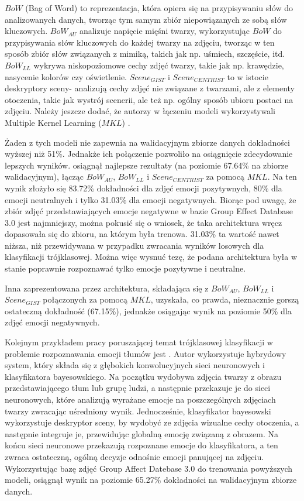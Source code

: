 $BoW$ (Bag of Word) \cite{BoW} to reprezentacja, która opiera się na przypisywaniu słów do analizowanych danych, tworząc tym samym zbiór niepowiązanych ze sobą słów kluczowych.
$BoW_{AU}$ analizuje napięcie mięśni twarzy, wykorzystując $BoW$ do przypisywania słów kluczowych do każdej twarzy na zdjęciu, tworząc w ten sposób zbiór słów związanych z mimiką, takich jak np. uśmiech, szczęście, itd.
$BoW_{LL}$ wykrywa niskopoziomowe cechy zdjęć twarzy, takie jak np. krawędzie, nasycenie kolorów czy oświetlenie. 
$Scene_{GIST}$ i $Scene_{CENTRIST}$ to w istocie deskryptory sceny- analizują cechy zdjęć nie związane z twarzami, ale z elementy otoczenia, takie jak wystrój scenerii, ale też np. ogólny sposób ubioru postaci na zdjęciu.
Należy jeszcze dodać, że autorzy w łączeniu modeli wykorzystywali Multiple Kernel Learning ($MKL$) \cite{MKL}. 

Żaden z tych modeli nie zapewnia na walidacyjnym zbiorze danych dokładności wyższej niż 51\%. Jednakże ich połączenie pozwoliło na osiągnięcie zdecydowanie lepszych wyników. \cite{GAD} osiągnął najlepsze rezultaty (na poziomie 67.64\% na zbiorze walidacyjnym), łącząc $BoW_{AU}$, $BoW_{LL}$ i $Scene_{CENTRIST}$ za pomocą $MKL$. Na ten wynik złożyło się 83.72\% dokładności dla zdjęć emocji pozytywnych, 80\% dla emocji neutralnych i tylko 31.03\% dla emocji negatywnych. Biorąc pod uwagę, że zbiór zdjęć przedstawiających emocje negatywne w bazie Group Effect Database 3.0 jest najmniejszy, można pokusić się o wniosek, że taka architektura wręcz dopasowała się do zbioru, na którym była trenowa. 31.03\% ta wartość nawet niższa, niż przewidywana w przypadku zwracania wyników losowych dla klasyfikacji trójklasowej. Można więc wysnuć tezę, że podana architektura była w stanie poprawnie rozpoznawać tylko emocje pozytywne i neutralne.

Inna zaprezentowana przez \cite{GAD} architektura, składająca się z $BoW_{AU}$, $BoW_{LL}$ i $Scene_{GIST}$ połączonych za pomocą $MKL$, uzyskała, co prawda, nieznacznie gorszą ostateczną dokładność (67.15\%), jednakże osiągając wynik na poziomie 50\% dla zdjęć emocji negatywnych.

Kolejnym przykładem pracy poruszającej temat trójklasowej klasyfikacji w problemie rozpoznawania emocji tłumów jest \cite{SGarg}. Autor wykorzystuje hybrydowy system, który składa się z głębokich konwolucyjnych sieci neuronowych i klasyfikatora bayesowskiego. Na początku wydobywa zdjęcia twarzy z obrazu przedstawiającego tłum lub grupę ludzi, a następnie przekazuje je do sieci neuronowych, które analizują wyrażane emocje na poszczególnych zdjęciach twarzy zwracając uśredniony wynik. Jednocześnie, klasyfikator bayesowski wykorzystuje deskryptor sceny, by wydobyć ze zdjęcia wizualne cechy otoczenia, a następnie integruje je, przewidując globalną emocję związaną z obrazem. Na końcu sieci neuronowe przekazują rozpoznane emocje do klasyfikatora, a ten zwraca ostateczną, ogólną decyzje odnośnie emocji panującej na zdjęciu. Wykorzystując bazę zdjęć Group Affect Datebase 3.0 do trenowania powyższych modeli, \cite{SGarg} osiągnął wynik na poziomie 65.27\% dokładności na walidacyjnym zbiorze danych.


